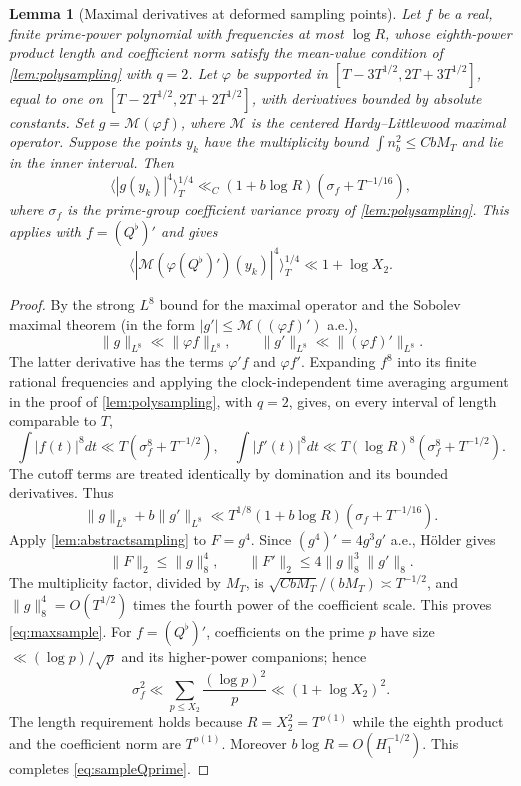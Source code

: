 \documentclass[11pt,reqno]{amsart}
\numberwithin{equation}{section}
\newtheorem{lemma}[theorem]{Lemma}
\begin{document}
\begin{lemma}[Maximal derivatives at deformed sampling points]
\label{lem:maxsample}
Let $f$ be a real, finite prime-power polynomial with frequencies
at most $\log R$, whose eighth-power product length and coefficient
norm satisfy the mean-value condition of
\cref{lem:polysampling} with $q=2$. Let $\varphi$ be supported in
$[T-3T^{1/2},2T+3T^{1/2}]$, equal to one on
$[T-2T^{1/2},2T+2T^{1/2}]$, with derivatives bounded
by absolute constants. Set $g=\mathcal M(\varphi f)$, where
$\mathcal M$ is the centered Hardy--Littlewood maximal operator.
Suppose the points $y_k$ have the multiplicity bound
$\int n_b^2\le CbM_T$ and lie in the inner interval. Then
\begin{equation}\label{eq:maxsample}
\bigl\langle |g(y_k)|^4\bigr\rangle_T^{1/4}
\ll_C (1+b\log R)\left(\sigma_f+T^{-1/16}\right),
\end{equation}
where $\sigma_f$ is the prime-group coefficient variance proxy
of \cref{lem:polysampling}.  This applies with
$f=(Q^\flat)'$ and gives
\begin{equation}\label{eq:sampleQprime}
\bigl\langle|\mathcal M(\varphi(Q^\flat)')(y_k)|^4
\bigr\rangle_T^{1/4}\ll 1+\log X_2.
\end{equation}
\end{lemma}
\begin{proof}
By the strong $L^8$ bound for the maximal operator and the
Sobolev maximal theorem (in the form $|g'|\le
\mathcal M((\varphi f)')$ a.e.),
\begin{equation}\label{eq:g8}
\|g\|_{L^8}\ll\|\varphi f\|_{L^8},\qquad
\|g'\|_{L^8}\ll\|(\varphi f)'\|_{L^8}.
\end{equation}
The latter derivative has the terms $\varphi' f$ and
$\varphi f'$.  Expanding $f^8$ into its finite rational
frequencies and applying the clock-independent time averaging
argument in the proof of \cref{lem:polysampling}, with $q=2$,
gives, on every interval of length comparable to $T$,
\[
\int |f(t)|^8dt\ll T(\sigma_f^8+T^{-1/2}),\quad
\int|f'(t)|^8dt\ll
T(\log R)^8(\sigma_f^8+T^{-1/2}).
\]
The cutoff terms are treated identically by domination and its
bounded derivatives. Thus
\[
\|g\|_{L^8}+b\|g'\|_{L^8}
\ll T^{1/8}(1+b\log R)
(\sigma_f+T^{-1/16}).
\]
Apply \cref{lem:abstractsampling} to $F=g^4$.
Since $(g^4)'=4g^3g'$ a.e., H\"older gives
\[
\|F\|_2\le\|g\|_8^4,\qquad
\|F'\|_2\le4\|g\|_8^3\|g'\|_8.
\]
The multiplicity factor, divided by $M_T$, is
$\sqrt{CbM_T}/(bM_T)\asymp T^{-1/2}$, and
$\|g\|_8^4=O(T^{1/2})$ times the fourth power of the
coefficient scale. This proves \eqref{eq:maxsample}.
For $f=(Q^\flat)'$, coefficients on the prime $p$ have size
$\ll(\log p)/\sqrt p$ and its higher-power companions; hence
\[
\sigma_f^2\ll\sum_{p\le X_2}\frac{(\log p)^2}{p}
\ll(1+\log X_2)^2.
\]
The length requirement holds because $R=X_2^2=T^{o(1)}$
while the eighth product and the coefficient norm are
$T^{o(1)}$. Moreover $b\log R=O(H_1^{-1/2})$.
This completes \eqref{eq:sampleQprime}.
\end{proof}
\end{document}
